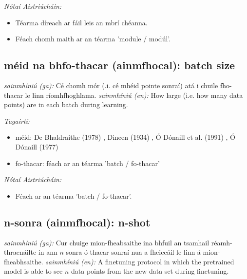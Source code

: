 \documentclass{article}
\begin{document}
 \noindent \textit{Nótaí Aistriúcháin:}
\begin{itemize}
	\item Téarma díreach ar fáil leis an mbrí chéanna.
	\item Féach chomh maith ar an téarma 'module / modúl'.
\end{itemize}


\subsection*{méid na bhfo-thacar (ainmfhocal): batch size} 
 \noindent \textit{sainmhíniú (ga):} Cé chomh mór (.i. cé mhéid pointe sonraí) atá i chuile fho-thacar le linn ríomhfhoghlama.
\newline\newline
 \noindent \textit{sainmhíniú (en):} How large (i.e. how many data points) are in each batch during learning.
\newline

 \noindent \textit{Tagairtí:}
\begin{itemize}
	\item méid: De Bhaldraithe (1978) \cite{de-bhaldraithe}, Dineen (1934) \cite{dineen}, Ó Dónaill et al. (1991) \cite{focloir-beag}, Ó Dónaill (1977) \cite{odonaill}
	\item fo-thacar: féach ar an téarma 'batch / fo-thacar'
\end{itemize}

 \noindent \textit{Nótaí Aistriúcháin:}
\begin{itemize}
	\item Féach ar an téarma 'batch / fo-thacar'.
\end{itemize}


\subsection*{n-sonra (ainmfhocal): n-shot} 
 \noindent \textit{sainmhíniú (ga):} Cur chuige mion-fheabsaithe ina bhfuil an tsamhail réamh-thraenáilte in ann $n$ sonra ó thacar sonraí nua a fheiceáil le linn á mion-fheabhsaithe.
\newline\newline
 \noindent \textit{sainmhíniú (en):} A finetuning protocol in which the pretrained model is able to see $n$ data points from the new data set during finetuning.
\newline
\end{document}
